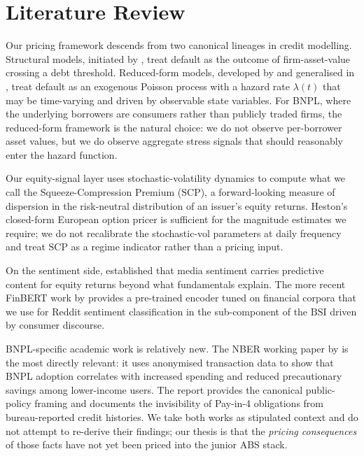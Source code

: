 \documentclass[11pt,letterpaper]{article}
\newcommand{\bsi}{\text{BSI}}
\newcommand{\scp}{\text{SCP}}
\begin{document}
\section{Literature Review}
\label{sec:lit}

Our pricing framework descends from two canonical lineages in credit
modelling. Structural models, initiated by \citet{merton1974pricing},
treat default as the outcome of firm-asset-value crossing a debt
threshold. Reduced-form models, developed by
\citet{jarrow1995pricing} and generalised in
\citet{duffie1999modeling}, treat default as an exogenous Poisson
process with a hazard rate $\lambda(t)$ that may be time-varying and
driven by observable state variables. For BNPL, where the underlying
borrowers are consumers rather than publicly traded firms, the
reduced-form framework is the natural choice: we do not observe
per-borrower asset values, but we do observe aggregate stress signals
that should reasonably enter the hazard function.

Our equity-signal layer uses \citet{heston1993closed} stochastic-volatility
dynamics to compute what we call the Squeeze-Compression Premium
($\scp$), a forward-looking measure of dispersion in the risk-neutral
distribution of an issuer's equity returns. Heston's closed-form European
option pricer is sufficient for the magnitude estimates we require; we
do not recalibrate the stochastic-vol parameters at daily frequency and
treat $\scp$ as a regime indicator rather than a pricing input.

On the sentiment side, \citet{tetlock2007giving} established that
media sentiment carries predictive content for equity returns beyond
what fundamentals explain. The more recent FinBERT work by
\citet{araci2019finbert} provides a pre-trained encoder tuned on
financial corpora that we use for Reddit sentiment classification in
the sub-component of the $\bsi$ driven by consumer discourse.

BNPL-specific academic work is relatively new. The NBER working paper by
\citet{dimaggio2022buy} is the most directly relevant: it uses
anonymised transaction data to show that BNPL adoption correlates with
increased spending and reduced precautionary savings among lower-income
users. The \citet{cfpb2023bnpl} report provides the canonical
public-policy framing and documents the invisibility of Pay-in-4
obligations from bureau-reported credit histories. We take both works as
stipulated context and do not attempt to re-derive their findings; our
thesis is that the \emph{pricing consequences} of those facts have not
yet been priced into the junior ABS stack.
\end{document}
